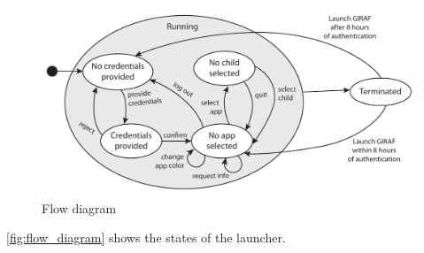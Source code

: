 \begin{figure}[h]
	\centering
	\includegraphics[width=1\textwidth]{gfx/statediagram.pdf}
	\caption{Flow diagram}
	\label{fig:flow_diagram}
\end{figure}

\autoref{fig:flow_diagram} shows the states of the launcher. %

